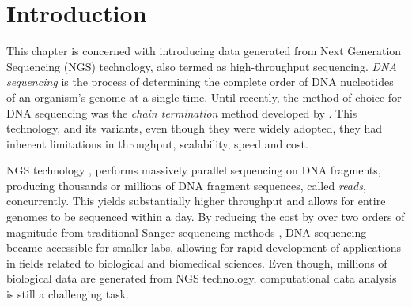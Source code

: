 \section{Introduction} \label{data-intro-sect}
This chapter is concerned with introducing data generated from Next Generation Sequencing (NGS) technology, also termed as high-throughput sequencing. \emph{DNA sequencing} is the process of determining the complete order of DNA nucleotides of an organism's genome at a single time. Until recently, the method of choice for DNA sequencing was the \emph{chain termination} method developed by \citet{Sanger1977}. This technology, and its variants, even though they were widely adopted, they had inherent limitations in throughput, scalability, speed and cost. 

NGS technology \citep{Shendure2008, Mardis2008}, performs massively parallel sequencing on DNA fragments, producing thousands or millions of DNA fragment sequences, called \emph{reads}, concurrently. This yields substantially higher throughput and allows for entire genomes to be sequenced within a day. By reducing the cost by over two orders of magnitude from traditional Sanger sequencing methods \citep{Shendure2008}, DNA sequencing became accessible for smaller labs, allowing for rapid development of applications in fields related to biological and biomedical sciences. Even though, millions of biological data are generated from NGS technology, computational data analysis is still a challenging task.